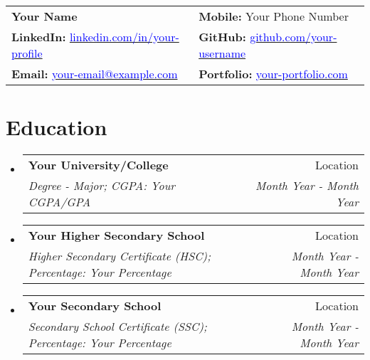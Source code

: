 \documentclass[a4paper,11pt]{article}
\makeatletter
\newcommand{\resumeSubheading}[4]{
  \vspace{-1pt}\item
  \begin{tabular*}{0.97\textwidth}{l@{\extracolsep{\fill}}r}
    \textbf{#1} & #2 \\
    \textit{#3} & \textit{#4} \\
  \end{tabular*}\vspace{-5pt}
}
\newcommand{\resumeSubHeadingListStart}{\begin{itemize}[leftmargin=*]}
\newcommand{\resumeSubHeadingListEnd}{\end{itemize}}
\makeatother
\begin{document}
\begin{tabular*}{\textwidth}{@{\extracolsep{\fill}}ll}

  \textbf{{\LARGE Your Name}} & 
  
  \textbf{Mobile:} Your Phone Number \\

  \textbf{LinkedIn:} \href{https://www.linkedin.com/in/your-profile}{\textcolor{blue} {linkedin.com/in/your-profile}} & 
  
  \textbf{GitHub:} \href{https://github.com/your-username}{\textcolor{blue}{github.com/your-username}} \\

  \textbf{Email:} \href{mailto:your-email@example.com} {\textcolor{blue}{your-email@example.com}} & \textbf{Portfolio:} \href{https://your-portfolio.com}{\textcolor{blue}{your-portfolio.com}}
\end{tabular*}

\section{\textbf{{\LARGE Education}}}
\resumeSubHeadingListStart

  \resumeSubheading
  {Your University/College}{Location}
  {Degree - Major; CGPA: Your CGPA/GPA}{Month Year - Month Year}

  \resumeSubheading
  {Your Higher Secondary School}{Location}
  {Higher Secondary Certificate (HSC); Percentage: Your Percentage}{Month Year - Month Year}

  \resumeSubheading
  {Your Secondary School}{Location}
  {Secondary School Certificate (SSC); Percentage: Your Percentage}{Month Year - Month Year}
\resumeSubHeadingListEnd
\end{document}
